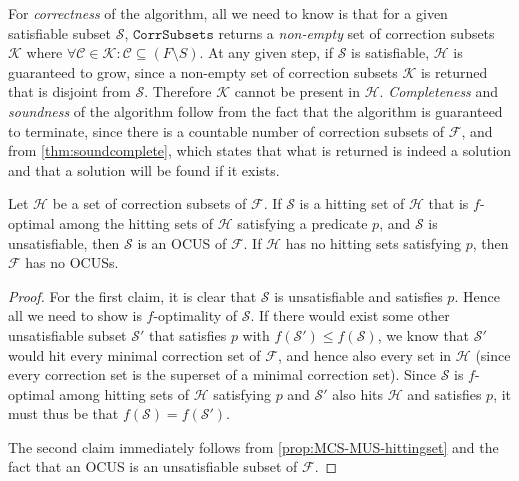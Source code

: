 \documentclass[a4paper,UKenglish,cleveref, autoref, thm-restate, pdfa]{lipics-v2021}
\newcommand\m[1]{\mathcal{#1}}
\renewcommand\comment[1]{}
\newcommand{\bart}[1]{{\comment{\color{OliveGreen}Bart: #1}}}
\newcommand\setstohit{\ensuremath{\m{H} }\xspace}
\newcommand\formula{\ensuremath{\m{F} }\xspace}
\newcommand\mm[1]{\ensuremath{#1}\xspace}
\newcommand\call[1]{\mm{\texttt{#1}}}
\newcommand\comus{\mm{\call{OCUS}}}
\newcommand\corrsubsets{\mm{\call{CorrSubsets}}}
\begin{document}
For \emph{correctness} of the algorithm, all we need to know is that for a given satisfiable subset $\m{S}$, \corrsubsets returns a \emph{non-empty} set of correction subsets~$\m{K}$ where $\forall \m{C} \in \m{K} : \m{C} \subseteq (F \setminus S)$. %
At any given step, if $\m{S}$ is satisfiable, $\setstohit$ is guaranteed to grow, since a non-empty set of correction subsets $\m{K}$ is returned that is disjoint from $\m{S}$. Therefore $\m{K}$ cannot be present in $\setstohit$. 
\emph{Completeness} and \emph{soundness} of the algorithm follow from the fact that the algorithm is guaranteed to terminate, since there is a countable number of correction subsets of $\formula$, and from %
\cref{thm:soundcomplete}, which states that what is returned is indeed a solution and that a solution will be found if it exists.  

\begin{theorem}\label{thm:soundcomplete}
	Let $\m{H}$ be a set of correction subsets of \formula. 
	If $\m{S}$ is a hitting set of $\m{H}$ that is $f$-optimal among the hitting sets of $\m{H}$ satisfying a predicate $p$, and  $\m{S}$ is unsatisfiable, then $\m{S}$ is an OCUS of $\formula$. 
	If  $\m{H}$ has no hitting sets satisfying $p$, then $\formula$ has no OCUSs.
\end{theorem}
\begin{proof}
	For the first claim, it is clear that $\m{S}$ is unsatisfiable and satisfies $p$. Hence all we need to show is $f$-optimality of $\m{S}$.
	If there would exist some other unsatisfiable subset $\m{S}'$ that satisfies $p$ with $f(\m{S}')\leq f(\m{S})$, we know that $\m{S}'$ would hit every minimal correction set of $\m{F}$, and hence also every set in $\m{H}$ (since every correction set is the superset of a minimal correction set).
	Since $\m{S}$ is $f$-optimal among hitting sets of $\m{H}$ satisfying $p$ and $\m{S}'$ also hits $\m{H}$ and satisfies $p$, it must thus be that $f(\m{S})=f(\m{S}')$. 
	
	The second claim immediately follows from \cref{prop:MCS-MUS-hittingset} and the fact that an OCUS is an unsatisfiable subset of $\formula$. 
\end{proof}
\end{document}
